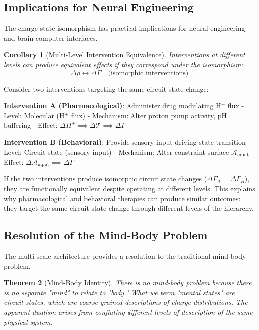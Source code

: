\documentclass[aps,prd,twocolumn,superscriptaddress,floatfix,nofootinbib]{revtex4-2}
\newtheorem{theorem}{Theorem}[section]
\newtheorem{corollary}[theorem]{Corollary}
\theoremstyle{remark}
\begin{document}
\subsection{Implications for Neural Engineering}

The charge-state isomorphism has practical implications for neural engineering and brain-computer interfaces.

\begin{corollary}[Multi-Level Intervention Equivalence]
\label{cor:intervention_equivalence}
Interventions at different levels can produce equivalent effects if they correspond under the isomorphism:
\begin{equation}
\Delta \rho \leftrightarrow \Delta \Gamma \quad \text{(isomorphic interventions)}
\end{equation}
\end{corollary}

\begin{example}
\label{ex:intervention_equivalence}
Consider two interventions targeting the same circuit state change:

\textbf{Intervention A (Pharmacological)}: Administer drug modulating H$^+$ flux
- Level: Molecular (H$^+$ flux)
- Mechanism: Alter proton pump activity, pH buffering
- Effect: $\Delta H^+ \implies \Delta \mathcal{T} \implies \Delta \Gamma$

\textbf{Intervention B (Behavioral)}: Provide sensory input driving state transition
- Level: Circuit state (sensory input)
- Mechanism: Alter constraint surface $\mathcal{A}_{\text{input}}$
- Effect: $\Delta \mathcal{A}_{\text{input}} \implies \Delta \Gamma$

If the two interventions produce isomorphic circuit state changes ($\Delta \Gamma_A = \Delta \Gamma_B$), they are functionally equivalent despite operating at different levels. This explains why pharmacological and behavioral therapies can produce similar outcomes: they target the same circuit state change through different levels of the hierarchy.
\end{example}

\subsection{Resolution of the Mind-Body Problem}

The multi-scale architecture provides a resolution to the traditional mind-body problem.

\begin{theorem}[Mind-Body Identity]
\label{thm:mind_body}
There is no mind-body problem because there is no separate "mind" to relate to "body." What we term "mental states" are circuit states, which are coarse-grained descriptions of charge distributions. The apparent dualism arises from conflating different levels of description of the same physical system.
\end{theorem}
\end{document}
